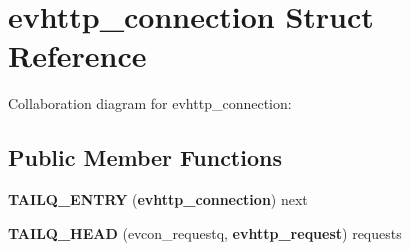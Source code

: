 \section{evhttp\-\_\-connection \-Struct \-Reference}
\label{structevhttp__connection}


\-Collaboration diagram for evhttp\-\_\-connection\-:
\subsection*{\-Public \-Member \-Functions}
\begin{DoxyCompactItemize}
\item 
{\bfseries \-T\-A\-I\-L\-Q\-\_\-\-E\-N\-T\-R\-Y} ({\bf evhttp\-\_\-connection}) next\label{structevhttp__connection_ac4d64da04877dbee22601f8a91d63af6}

\item 
{\bfseries \-T\-A\-I\-L\-Q\-\_\-\-H\-E\-A\-D} (evcon\-\_\-requestq, {\bf evhttp\-\_\-request}) requests\label{structevhttp__connection_a71f580d3a82504ca2239dc09f1bd1ed6}

\end{DoxyCompactItemize}
